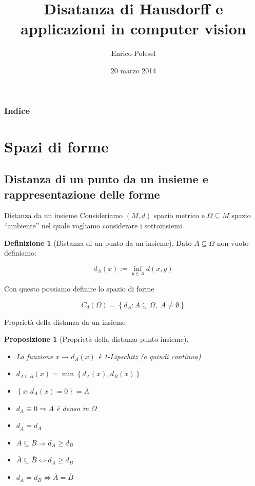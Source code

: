 \documentclass{beamer}
\title[Distanza di Hausdorff]{Disatanza di Hausdorff e applicazioni
  in computer vision}
\author{Enrico Polesel}
\institute[Scuola Normale Superiore]{Scuola Normale Superiore}
\date{20 marzo 2014}
\newcounter{counter1}
\theoremstyle{plain}
\newtheorem{mypro}[counter1]{Proposizione}
\theoremstyle{definition}
\newtheorem{mydef}[counter1]{Definizione}
\theoremstyle{remark}
\newcommand{\obar}[1]{\overline{#1}}
\newcommand{\set}[1]{\left\{#1\right\}}
\begin{document}
\begin{frame}[plain]
  \titlepage
\end{frame}

\begin{frame}
 \frametitle{Indice}
 \tableofcontents
\end{frame}




\AtBeginSubsection[]
{
  \begin{frame}{\secname $\rightarrow$ \subsecname}
    \tableofcontents[currentsubsection]
  \end{frame}
}

\section{Spazi di forme}

\subsection{Distanza di un punto da un insieme e rappresentazione delle forme}


\begin{frame}{Distanza da un insieme}
  Consideriamo $(M,d)$ spazio metrico e $\Omega \subseteq M$ spazio
  ``ambiente'' nel quale vogliamo considerare i sottoinsiemi.
  
  \begin{mydef}[Distanza di un punto da un insieme]
    Dato $A \subseteq \Omega$ non vuoto definiamo:
    
    \[  d_A (x) := \inf _{y \in A} d(x,y) \] 
  \end{mydef}
  
  Con questo possiamo definire lo spazio di forme
  
  \[ C_d(\Omega) = \set{d_A : A \subseteq \Omega,\; A \neq \emptyset} \]
\end{frame}

\begin{frame}{Proprietà della distanza da un insieme}
  \begin{mypro}[Proprietà della distanza punto-insieme]
    \begin{itemize}
    \item La funzione $x \rightarrow d_A(x)$ è 1-Lipschitz (e quindi
      continua)
    \item $d_{A\cup B}(x) = \min\set{d_A(x),d_B(x)}$
    \item $\set{x:d_A(x) = 0} = \obar A$
    \item $d_A \equiv 0 \Rightarrow A$ è denso in $\Omega$
    \item $d_{\obar A} = d_A$
    \item $A\subseteq B \Rightarrow d_A \ge d_B$
    \item $\obar{ A} \subseteq \obar B \Leftrightarrow d_A \ge d_B$
    \item $d_A = d_B \Leftrightarrow \obar A = \obar B$
    \end{itemize}
  \end{mypro}
\end{frame}
\end{document}
